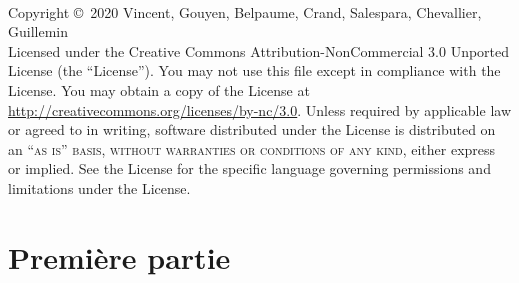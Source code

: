 \documentclass[11pt,fleqn]{book} %
\begin{document}
\newpage
~\vfill
\thispagestyle{empty}

\noindent Copyright \copyright\ 2020 Vincent, Gouyen, Belpaume, Crand, Salespara, Chevallier, Guillemin\\ %



\noindent Licensed under the Creative Commons Attribution-NonCommercial 3.0 Unported License (the ``License''). You may not use this file except in compliance with the License. You may obtain a copy of the License at \url{http://creativecommons.org/licenses/by-nc/3.0}. Unless required by applicable law or agreed to in writing, software distributed under the License is distributed on an \textsc{``as is'' basis, without warranties or conditions of any kind}, either express or implied. See the License for the specific language governing permissions and limitations under the License.\\ %






\pagestyle{empty} %

\tableofcontents %

\cleardoublepage %

\pagestyle{fancy} %

\part{Première partie}
\end{document}
